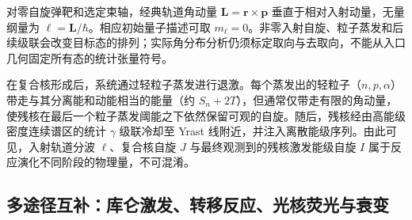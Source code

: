 对零自旋弹靶和选定束轴，经典轨道角动量 $\mathbf L=\mathbf r\times\mathbf p$ 垂直于相对入射动量，无量纲量为 $\boldsymbol\ell=\mathbf L/\hbar$。相应初始量子描述可取 $m_\ell=0$\cite{diamond-1966-nuclear-alignment-heavy-ion-reactions}。非零入射自旋、粒子蒸发和后续级联会改变目标态的排列；实际角分布分析仍须标定取向与去取向，不能从入口几何固定所有态的统计张量符号。

在复合核形成后，系统通过轻粒子蒸发进行退激。每个蒸发出的轻粒子（$n, p, \alpha$）带走与其分离能和动能相当的能量（约 $S_n + 2T$），但通常仅带走有限的角动量，使残核在最后一个粒子蒸发阈能之下依然保留可观的自旋。随后，残核经由高能级密度连续谱区的统计 $\gamma$ 级联冷却至 Yrast 线附近，并注入离散能级序列。由此可见，入射轨道分波 $\ell$、复合核自旋 $J$ 与最终观测到的残核激发能级自旋 $I$ 属于反应演化不同阶段的物理量，不可混淆。

\subsection{多途径互补：库仑激发、转移反应、光核荧光与衰变}\label{subsec:5-1-3}

